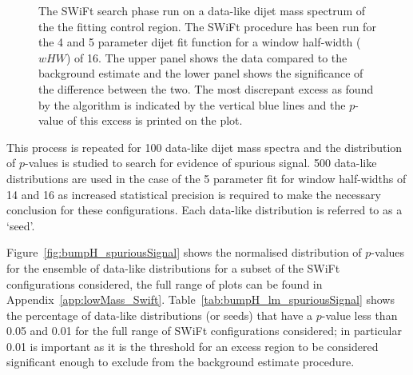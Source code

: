 \begin{figure}[!htb]
\caption{\label{fig:bhFit_lm_corrFitCR_dataLike}
  The SWiFt search phase run on a data-like dijet mass spectrum of the the \lm{} fitting control region.
  The SWiFt procedure has been run for the 4 and 5 parameter dijet fit function for a window half-width ($wHW$) of 16.
  The upper panel shows the data compared to the background estimate and the lower panel shows the significance of the difference between the two.
  The most discrepant excess as found by the \bh{} algorithm is indicated by the vertical blue lines and the \mbox{$p$-value} of this excess is printed on the plot. 
}
\end{figure}

This process is repeated for 100 data-like dijet mass spectra and the distribution of \bh{} \mbox{$p$-value}s is studied to search for evidence of spurious signal.
500 data-like distributions are used in the case of the 5 parameter fit for window half-widths of 14 and 16
as increased statistical precision is required to make the necessary conclusion for these configurations.
Each data-like distribution is referred to as a `seed'.%

Figure~\ref{fig:bumpH_spuriousSignal} shows the normalised distribution of \mbox{$p$-value}s for the ensemble of data-like distributions
for a subset of the SWiFt configurations considered, the full range of plots can be found in Appendix~\ref{app:lowMass_Swift}.
Table~\ref{tab:bumpH_lm_spuriousSignal} shows the percentage of data-like distributions (or seeds)
that have a \bh{} \mbox{$p$-value} less than %
0.05 and 0.01 for the full range of SWiFt configurations considered;
in particular 0.01 is important as it is the threshold for an excess region to be considered significant enough
to exclude from the background estimate procedure.


